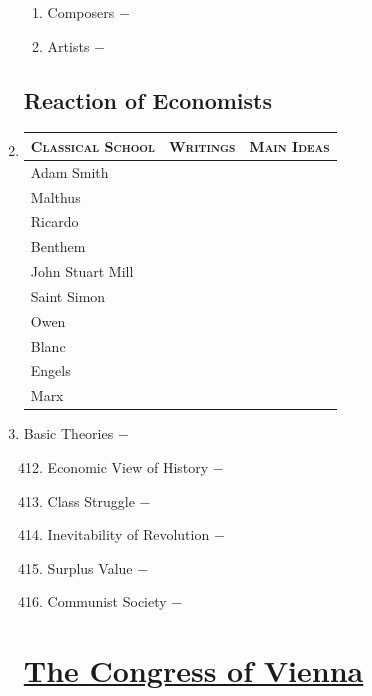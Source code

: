 \documentclass[12pt]{article}
\begin{document}
\begin{enumerate}
\begin{enumerate}[label=\arabic{*}.]
\item Composers $-$ 

\item Artists $-$  


\end{enumerate}
\setcounter{enumi}{409}

\subsection{Reaction of Economists}

\item \begin{tabular}{l c c}
\textsc{Classical School} & \textsc{Writings} & \textsc{Main Ideas} \\
\hline
Adam Smith & & \\
\hline
Malthus & & \\
\hline 
Ricardo & & \\
\hline
Benthem & & \\
\hline
John Stuart Mill & & \\
\hline
Saint Simon & & \\
\hline
Owen & & \\
\hline
Blanc & & \\
\hline
Engels & & \\
\hline
Marx & & \\
\end{tabular}

\item Basic Theories $-$

\begin{enumerate}[label=\arabic{*}.]
\setcounter{enumii}{411}

\item Economic View of History $-$

\item Class Struggle $-$

\item Inevitability of Revolution $-$ 

\item Surplus Value $-$

\item Communist Society $-$ 

\end{enumerate}
\setcounter{enumi}{416}

\section{\underline{The Congress of Vienna}}


\end{enumerate}
\end{document}
